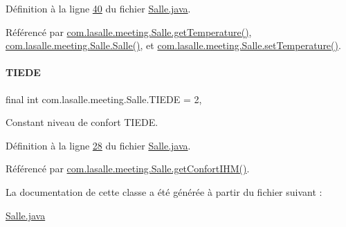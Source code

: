 Définition à la ligne \hyperlink{_salle_8java_source_l00040}{40} du fichier \hyperlink{_salle_8java_source}{Salle.\+java}.



Référencé par \hyperlink{_salle_8java_source_l00267}{com.\+lasalle.\+meeting.\+Salle.\+get\+Temperature()}, \hyperlink{_salle_8java_source_l00054}{com.\+lasalle.\+meeting.\+Salle.\+Salle()}, et \hyperlink{_salle_8java_source_l00138}{com.\+lasalle.\+meeting.\+Salle.\+set\+Temperature()}.

\mbox{\label{classcom_1_1lasalle_1_1meeting_1_1_salle_ab6fdb3566901998a91c1cd17f589f607}} 
\paragraph{\texorpdfstring{T\+I\+E\+DE}{TIEDE}}
{\footnotesize\ttfamily final int com.\+lasalle.\+meeting.\+Salle.\+T\+I\+E\+DE = 2\hspace{0.3cm}{\ttfamily [static]}, {\ttfamily [private]}}



Constant niveau de confort T\+I\+E\+DE. 



Définition à la ligne \hyperlink{_salle_8java_source_l00028}{28} du fichier \hyperlink{_salle_8java_source}{Salle.\+java}.



Référencé par \hyperlink{_salle_8java_source_l00233}{com.\+lasalle.\+meeting.\+Salle.\+get\+Confort\+I\+H\+M()}.



La documentation de cette classe a été générée à partir du fichier suivant \+:\begin{DoxyCompactItemize}
\item 
\hyperlink{_salle_8java}{Salle.\+java}\end{DoxyCompactItemize}
